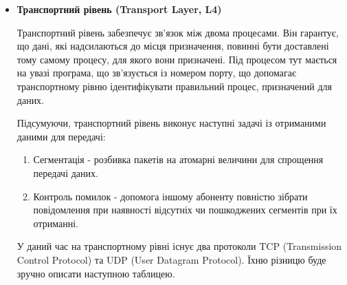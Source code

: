 \begin{itemize}
    \item \textbf{Транспортний рівень (Transport Layer, L4)}
    
    Транспортний рівень забезпечує зв'язок між двома процесами. Він гарантує, що дані, які надсилаються до місця призначення, повинні бути доставлені тому самому процесу, для якого вони призначені. Під процесом тут мається на увазі програма, що зв'язується із номером порту, що допомагає транспортному рівню ідентифікувати правильний процес, призначений для даних.

    Підсумуючи, транспортний рівень виконує наступні задачі із отриманими даними для передачі:
    \begin{enumerate}
        \item Сегментація - розбивка пакетів на атомарні величини для спрощення передачі даних.
        \item Контроль помилок - допомога іншому абоненту повністю зібрати повідомлення при наявності відсутніх чи пошкоджених сегментів при їх отриманні.
    \end{enumerate}

    У даний час на транспортному рівні існує два протоколи TCP (Transmission Control Protocol) та UDP (User Datagram Protocol). Їхню різницю буде зручно описати наступною таблицею.


\end{itemize}
